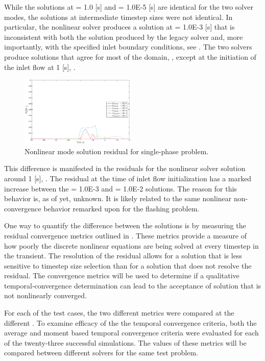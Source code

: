 While the solutions at \dtmax{} = 1.0 [s] and \dtmax{} = 1.0E-5 [s] are identical for the two solver modes, the solutions at intermediate timestep sizes were not identical.
In particular, the nonlinear solver produces a solution at \dtmax{} = 1.0E-3 [s] that is inconsistent with both the solution produced by the legacy solver and, more importantly, with the specified inlet boundary conditions, see .
The two solvers produce solutions that agree for most of the domain, , except at the initiation of the inlet flow at 1 [s], .

\begin{figure}[h!t]
\centering
\includegraphics[width=0.49\textwidth]{images/nl_res_single_zoom.eps}
\caption{Nonlinear mode solution residual for single-phase problem.}
\label{fig:nl_res_single_zoom}
\end{figure}

This difference is manifested in the residuals for the nonlinear solver solution around 1 [s], .
The residual at the time of inlet flow initialization has a marked increase between the \dtmax{} = 1.0E-3 and \dtmax{} = 1.0E-2 solutions.
The reason for this behavior is, as of yet, unknown.
It is likely related to the same nonlinear non-convergence behavior remarked upon for the flashing problem. 

One way to quantify the difference between the solutions is by measuring the residual convergence metrics outlined in .
These metrics provide a measure of how poorly the discrete nonlinear equations are being solved at every timestep in the transient.
The resolution of the residual allows for a solution that is less sensitive to timestep size selection than for a solution that does not resolve the residual.
The convergence metrics will be used to determine if a qualitative temporal-convergence determination can lead to the acceptance of solution that is not nonlinearly converged.

For each of the test cases, the two different metrics were compared at the different \dtmax{}.
To examine efficacy of the the temporal convergence criteria, both the average and moment based temporal convergence criteria were evaluated for each of the twenty-three successful simulations.
The values of these metrics will be compared between different solvers for the same test problem. 

